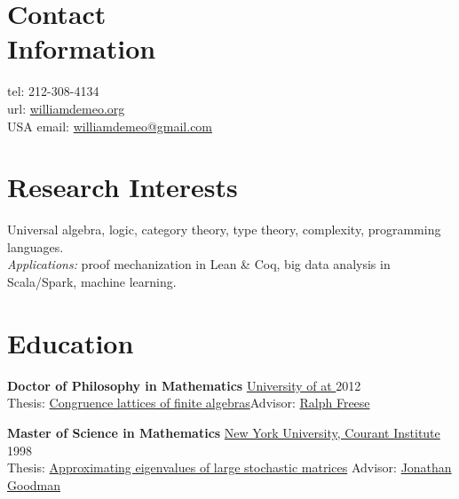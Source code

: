 \documentclass[margin,line]{resume}
\begin{document}
\begin{resume}

    \section{\mysidestyle Contact\\Information}
     \streetaddress   \hfill tel: 212-308-4134\\
     \citystatezip       \hfill url: \href{http://williamdemeo.org}{williamdemeo.org}\\
     {\small USA}             \hfill email: \href{mailto:williamdemeo@gmail.com}{williamdemeo@gmail.com}

     \vspace{-1mm}
     \section{\mysidestyle Research Interests}

     Universal algebra, logic, category theory, type theory, complexity, programming languages.\\[3pt] 
     {\it Applications:} proof mechanization in Lean \& Coq, big data analysis in Scala/Spark, machine learning.
        

    \vspace{-1mm}
    \section{\mysidestyle Education}

    \textbf{Doctor of Philosophy in Mathematics} \hfill \href{https://math.hawaii.edu/wordpress/}{University of \Hawaii at \Manoa} 2012\\    
    {\small Thesis: \href{https://arxiv.org/abs/1204.4305}{Congruence lattices of finite algebras}\hfill Advisor:  \href{http://math.hawaii.edu/~ralph/}{Ralph Freese}}

    \vspace{-1mm}
    \textbf{Master of Science in Mathematics} \hfill \href{https://cims.nyu.edu/}{New York University, Courant Institute} 1998\\
    {\small Thesis: \href{https://williamdemeo.github.io/MSThesis/}{Approximating eigenvalues of large stochastic matrices} \hfill Advisor: \href{https://www.math.nyu.edu/faculty/goodman/index.html}{Jonathan Goodman}}


\end{resume}
\end{document}
